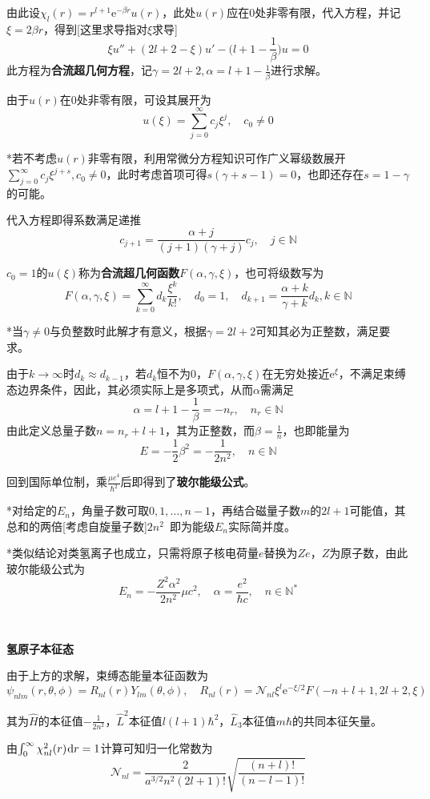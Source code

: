 \documentclass[a4paper,UTF8,fontset=windows]{ctexart}
\newcommand*{\dr}{\hspace{0.07em}\mathrm{d}}
\newcommand*{\er}{\mathrm{e}}
\begin{document}
由此设$\chi_l(r)=r^{l+1}\er^{-\beta r}u(r)$，此处$u(r)$应在0处非零有限，代入方程，并记$\xi=2\beta r$，得到[这里求导指对$\xi$求导]
$$\xi u''+(2l+2-\xi)u'-\bigg(l+1-\frac{1}{\beta}\bigg)u=0$$
此方程为\textbf{合流超几何方程}，记$\gamma=2l+2,\alpha=l+1-\frac{1}{\beta}$进行求解。

由于$u(r)$在0处非零有限，可设其展开为
$$u(\xi)=\sum_{j=0}^\infty c_j\xi^j,\quad c_0\ne 0$$

*若不考虑$u(r)$非零有限，利用常微分方程知识可作广义幂级数展开$\sum_{j=0}^\infty c_j\xi^{j+s},c_0\ne0$，此时考虑首项可得$s(\gamma+s-1)=0$，也即还存在$s=1-\gamma$的可能。

代入方程即得系数满足递推
$$c_{j+1}=\frac{\alpha+j}{(j+1)(\gamma+j)}c_j,\quad j\in\mathbb{N}$$

$c_0=1$的$u(\xi)$称为\textbf{合流超几何函数}$F(\alpha,\gamma,\xi)$，也可将级数写为
$$F(\alpha,\gamma,\xi)=\sum_{k=0}^\infty d_k\frac{\xi^k}{k!},\quad d_0=1,\quad d_{k+1}=\frac{\alpha+k}{\gamma+k}d_k,k\in\mathbb{N}$$

*当$\gamma\ne0$与负整数时此解才有意义，根据$\gamma=2l+2$可知其必为正整数，满足要求。

由于$k\to\infty$时$d_k\approx d_{k-1}$，若$d_k$恒不为0，$F(\alpha,\gamma,\xi)$在无穷处接近$\er^\xi$，不满足束缚态边界条件，因此，其必须实际上是多项式，从而$\alpha$需满足
$$\alpha=l+1-\frac{1}{\beta}=-n_r,\quad n_r\in\mathbb{N}$$
由此定义总量子数$n=n_r+l+1$，其为正整数，而$\beta=\frac{1}{n}$，也即能量为
$$E=-\frac{1}{2}\beta^2=-\frac{1}{2n^2},\quad n\in\mathbb{N}$$

回到国际单位制，乘$\frac{\mu e^4}{\hbar^2}$后即得到了\textbf{玻尔能级公式}。

*对给定的$E_n$，角量子数可取$0,1,\dots,n-1$，再结合磁量子数$m$的$2l+1$可能值，其总和的两倍[考虑自旋量子数]$2n^2$\ 即为能级$E_n$实际简并度。

*类似结论对类氢离子也成立，只需将原子核电荷量$e$替换为$Ze$，$Z$为原子数，由此玻尔能级公式为
$$E_n=-\frac{Z^2\alpha^2}{2n^2}\mu c^2,\quad\alpha=\frac{e^2}{\hbar c},\quad n\in\mathbb{N}^*$$

\

\textbf{氢原子本征态}

由于上方的求解，束缚态能量本征函数为
$$\psi_{nlm}(r,\theta,\phi)=R_{nl}(r)Y_{lm}(\theta,\phi),\quad R_{nl}(r)=\mathcal{N}_{nl}\xi^l\er^{-\xi/2}F(-n+l+1,2l+2,\xi)$$

其为$\hat{H}$的本征值$-\frac{1}{2n^2}$，$\hat{L}^2$本征值$l(l+1)\hbar^2$，$\hat{L}_3$本征值$m\hbar$的共同本征矢量。

由$\int_0^\infty\chi_{nl}^2(r)\dr r=1$计算可知归一化常数为
$$\mathcal{N}_{nl}=\frac{2}{a^{3/2}n^2(2l+1)!}\sqrt{\frac{(n+l)!}{(n-l-1)!}}$$
\end{document}
